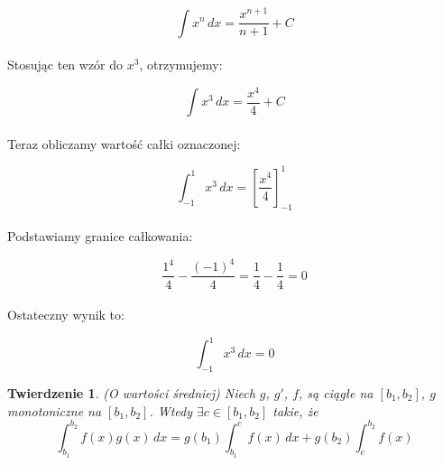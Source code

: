 \documentclass{article}
\newtheorem{theorem}{Twierdzenie}
\theoremstyle{definition}
\begin{document}
	\[
	\int x^n \, dx = \frac{x^{n+1}}{n+1} + C 
	\] \\Stosując ten wzór do \( x^3 \), otrzymujemy:
	
	\[
	\int x^3 \, dx = \frac{x^4}{4} + C
	\]\\Teraz obliczamy wartość całki oznaczonej:
	
	\[
	\int_{-1}^{1} x^3 \, dx = \left[ \frac{x^4}{4} \right]_{-1}^{1}
	\]\\Podstawiamy granice całkowania:
	
	\[
	\frac{1^4}{4} - \frac{(-1)^4}{4} = \frac{1}{4} - \frac{1}{4} = 0
	\]\\Ostateczny wynik to:
	
	\[
	\int_{-1}^{1} x^3 \, dx = 0
	\]
	
	
	
	\begin{theorem}{(O wartości średniej)}
		Niech $g$, $g'$, $f$, są ciągłe na $[b_1, b_2]$, $g$ monotoniczne na $[b_1, b_2]$. Wtedy $ \exists c \in [b_1, b_2]$ takie, że
		\begin{equation}\label{wartość średnhia całki }
			\int_{b_1}^{b_2} f(x)g(x) \, dx = g(b_1)\int_{b_1}^{c}f(x) \, dx + g(b_2)\int_{c}^{b_2}f(x)
		\end{equation}
	\end{theorem}
	
\end{document}
